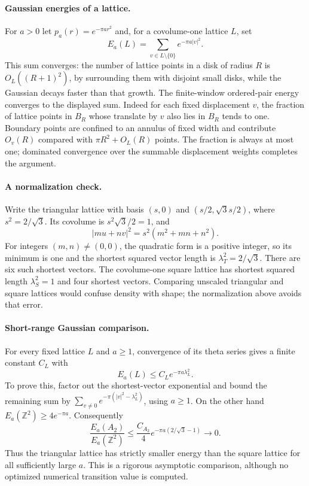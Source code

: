 \documentclass[11pt]{article}
\begin{document}
\paragraph{Gaussian energies of a lattice.}
For $a>0$ let $p_a(r)=e^{-\pi ar^2}$ and, for a covolume-one lattice $L$, set
\[
E_a(L)=\sum_{v\in L\setminus\{0\}}e^{-\pi a|v|^2}.
\]
This sum converges: the number of lattice points in a disk of radius $R$ is $O_L((R+1)^2)$, by surrounding them with disjoint small disks, while the Gaussian decays faster than that growth. The finite-window ordered-pair energy converges to the displayed sum. Indeed for each fixed displacement $v$, the fraction of lattice points in $B_R$ whose translate by $v$ also lies in $B_R$ tends to one. Boundary points are confined to an annulus of fixed width and contribute $O_v(R)$ compared with $\pi R^2+O_L(R)$ points. The fraction is always at most one; dominated convergence over the summable displacement weights completes the argument.

\paragraph{A normalization check.}
Write the triangular lattice with basis $(s,0)$ and $(s/2,\sqrt3s/2)$, where $s^2=2/\sqrt3$. Its covolume is $s^2\sqrt3/2=1$, and
\[
|mu+nv|^2=s^2(m^2+mn+n^2).
\]
For integers $(m,n)\ne(0,0)$, the quadratic form is a positive integer, so its minimum is one and the shortest squared vector length is $\lambda_T^2=2/\sqrt3$. There are six such shortest vectors. The covolume-one square lattice has shortest squared length $\lambda_S^2=1$ and four shortest vectors. Comparing unscaled triangular and square lattices would confuse density with shape; the normalization above avoids that error.

\paragraph{Short-range Gaussian comparison.}
For every fixed lattice $L$ and $a\ge1$, convergence of its theta series gives a finite constant $C_L$ with
\[
E_a(L)\le C_L e^{-\pi a\lambda_L^2}.
\]
To prove this, factor out the shortest-vector exponential and bound the remaining sum by $\sum_{v\ne0}e^{-\pi(|v|^2-\lambda_L^2)}$, using $a\ge1$. On the other hand $E_a(\mathbb Z^2)\ge4e^{-\pi a}$. Consequently
\[
\frac{E_a(A_2)}{E_a(\mathbb Z^2)}
\le\frac{C_{A_2}}4 e^{-\pi a(2/\sqrt3-1)}\longrightarrow0.
\]
Thus the triangular lattice has strictly smaller energy than the square lattice for all sufficiently large $a$. This is a rigorous asymptotic comparison, although no optimized numerical transition value is computed.
\end{document}
